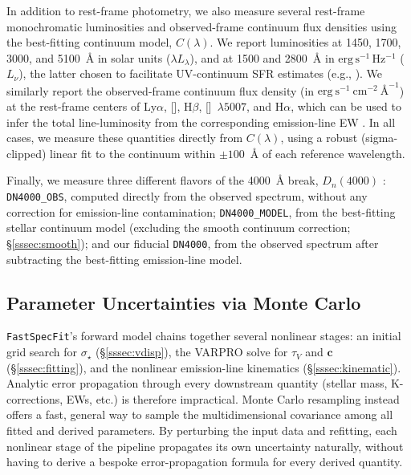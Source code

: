 \documentclass[modern,linenumbers]{aastex701}
\newcommand{\fastspecfit}{\texttt{FastSpecFit}}
\newcommand{\fluxdensity}{\ensuremath{\mathrm{erg~s}^{-1}~\mathrm{cm}^{-2}~\text{\AA}^{-1}}}
\newcommand{\oii}{[\ion{O}{2}]}
\newcommand{\lya}{Ly\ensuremath{\alpha}}
\newcommand{\ha}{H\ensuremath{\alpha}}
\newcommand{\hb}{H\ensuremath{\beta}}
\newcommand{\oiiilam}{[\ion{O}{3}]~$\lambda5007$}
\newcommand{\vdisp}{\ensuremath{\sigma_\star}}
\newcommand{\tauv}{\ensuremath{\tau_V}}
\begin{document}
In addition to rest-frame photometry, we also measure several
rest-frame monochromatic luminosities and observed-frame continuum
flux densities using the best-fitting continuum model,
$C(\lambda)$. We report luminosities at 1450, 1700, 3000, and
5100~\AA{} in solar units ($\lambda L_\lambda$), and at 1500 and
2800~\AA{} in $\mathrm{erg\,s^{-1}\,Hz^{-1}}$ ($L_\nu$), the latter
chosen to facilitate UV-continuum SFR estimates (e.g.,
\citealt{kennicutt98a}). We similarly report the observed-frame
continuum flux density (in \fluxdensity) at the rest-frame centers of
\lya, \oii, \hb, \oiiilam, and \ha, which can be used to infer the
total line-luminosity from the corresponding emission-line EW
\citep[e.g.,][]{zhu09a}. In all cases, we measure these quantities
directly from $C(\lambda)$, using a robust (sigma-clipped) linear fit
to the continuum within $\pm100$~\AA{} of each reference wavelength.


Finally, we measure three different flavors of the 4000~\AA{} break,
$D_n(4000)$ \citep{balogh99a}: \texttt{DN4000\_OBS}, computed directly
from the observed spectrum, without any correction for emission-line
contamination; \texttt{DN4000\_MODEL}, from the best-fitting stellar
continuum model (excluding the smooth continuum correction;
\S\ref{sssec:smooth}); and our fiducial \texttt{DN4000}, from the
observed spectrum after subtracting the best-fitting emission-line
model.


\subsection{Parameter Uncertainties via Monte Carlo}
\label{ssec:uncertainties}

\fastspecfit{}'s forward model chains together several nonlinear
stages: an initial grid search for \vdisp{} (\S\ref{sssec:vdisp}), the
VARPRO solve for \tauv{} and $\mathbf{c}$ (\S\ref{sssec:fitting}), and
the nonlinear emission-line kinematics (\S\ref{sssec:kinematic}).
Analytic error propagation through every downstream quantity (stellar
mass, K-corrections, EWs, etc.) is therefore impractical. Monte Carlo
resampling instead offers a fast, general way to sample the
multidimensional covariance among all fitted and derived parameters.
By perturbing the input data and refitting, each nonlinear stage of
the pipeline propagates its own uncertainty naturally, without having
to derive a bespoke error-propagation formula for every derived
quantity.
\end{document}
